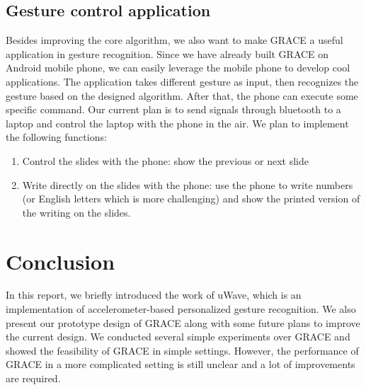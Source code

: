 \documentclass{acm_proc_article-sp}
\begin{document}
\subsection{Gesture control application}
Besides improving the core algorithm, we also want to make GRACE a useful application in gesture recognition. Since we have already built GRACE on Android mobile phone, we can easily leverage the mobile phone to develop cool applications. The application takes different gesture as input, then recognizes the gesture based on the designed algorithm. After that, the phone can execute some specific command. Our current plan is to send signals through bluetooth to a laptop and control the laptop with the phone in the air. We plan to implement the following functions:
\begin{enumerate}
  \item Control the slides with the phone: show the previous or next slide 
  \item Write directly on the slides with the phone: use the phone to write numbers (or English letters which is more challenging) and show the printed version of the writing on the slides.
\end{enumerate}

\section{Conclusion}
\label{conclusion}
In this report, we briefly introduced the work of uWave, which is an implementation of accelerometer-based personalized gesture recognition. We also present our prototype design of GRACE along with some future plans to improve the current design. We conducted several simple experiments over GRACE and showed the feasibility of GRACE in simple settings. However, the performance of GRACE in a more complicated setting is still unclear and a lot of improvements are required.


%
\nocite{*}


\end{document}

